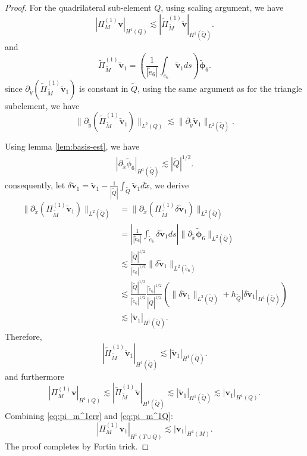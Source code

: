 \documentclass[10pt,a4paper]{amsart}
\begin{document}
\begin{proof}
	For the quadrilateral sub-element $Q$, using scaling argument, we have
	\begin{equation*}
		|\Pi^{(1)}_M \boldsymbol{v}|_{H^1(Q)} \lesssim |\tilde{\Pi}^{(1)}_{\tilde{M}} \boldsymbol{\tilde{v}}|_{H^1(\tilde{Q})}.
	\end{equation*}
    and 
    \[
    \tilde{\Pi}^{(1)}_{\tilde{M}} \boldsymbol{\tilde{v}}_1 = \left( \frac{1}{|\tilde{e}_6|} \int_{\tilde{e}_6} \boldsymbol{\tilde{v}}_1  ds \right) \boldsymbol{\tilde{\phi}}_6.
    \]
    since $\partial_{\tilde{y}} (\tilde{\Pi}^{(1)}_{\tilde{M}} \boldsymbol{\tilde{v}}_1)$ is constant in $\tilde{Q}$, using the same argument as for the triangle subelement, we have 
    \[
    \|\partial_{\tilde{y}} (\tilde{\Pi}^{(1)}_{\tilde{M}} \boldsymbol{\tilde{v}}_1)\|_{L^2(Q)} \lesssim \|\partial_{\tilde{y}} \boldsymbol{\tilde{v}}_1\|_{L^2(\tilde{Q})}.
    \]
    
    Using lemma \ref{lem:basis-est}, we have
    \begin{align*}
    	|\partial_{\tilde{x}}\tilde{\phi}_6|_{H^1(\tilde{Q})}\lesssim |\tilde{Q}|^{1/2}.
    \end{align*}
    consequently,  let $\delta \boldsymbol{\tilde{v}}_1 = \boldsymbol{\tilde{v}}_1 - \frac{1}{|\tilde{Q}|}\int_{\tilde{Q}}\boldsymbol{\tilde{v}}_1 d\tilde{x}$, we derive
	\begin{align*}
		\|\partial_{\tilde{x}} (\Pi^{(1)}_{\tilde{M}} \boldsymbol{\tilde{v}}_1)\|_{L^2(\tilde{Q})} 
		&=\|\partial_{\tilde{x}} (\Pi^{(1)}_{\tilde{M}} \delta\boldsymbol{\tilde{v}}_1)\|_{L^2(\tilde{Q})} \\
		&= \left| \frac{1}{|\tilde{e}_6|} \int_{\tilde{e}_6} \delta\boldsymbol{\tilde{v}}_1  ds \right| \|\partial_{\tilde{x}} \boldsymbol{\tilde{\phi}}_6\|_{L^2(\tilde{Q})} \\
		&\lesssim \frac{|\tilde{Q}|^{1/2}}{|\tilde{e}_6|^{1/2}}\|\delta\boldsymbol{\tilde{v}}_1\|_{L^2(\tilde{e}_6)}\\
		&\lesssim \frac{|\tilde{Q}|^{1/2}}{|\tilde{e}_6|^{1/2}} \frac{|\tilde{e}_6|^{1/2}}{|\tilde{Q}|^{1/2}}(\|\delta\boldsymbol{\tilde{v}}_1\|_{L^2(\tilde{Q})} + h_{\tilde{Q}}|\delta\boldsymbol{\tilde{v}}_1|_{H^1(\tilde{Q})} )\\
		&\lesssim |\boldsymbol{\tilde{v}}_1|_{H^1(\tilde{Q})}.
	\end{align*}
	Therefore,
	\begin{equation}\label{eq:pi_m^1Q}
		|\tilde{\Pi}^{(1)}_{\tilde{M}} \boldsymbol{\tilde{v}}_1|_{H^1(\tilde{Q})} \lesssim |\boldsymbol{\tilde{v}}_1|_{H^1(\tilde{Q})}.
	\end{equation}
	and furthermore
	\begin{equation*}
		|\Pi^{(1)}_M \boldsymbol{v}|_{H^1(Q)} \lesssim |\tilde{\Pi}^{(1)}_{\tilde{M}} \boldsymbol{\tilde{v}}|_{H^1(\tilde{Q})}
		\lesssim |\boldsymbol{\tilde{v}}_1|_{H^1(\tilde{Q})}\lesssim |\bm{v}_1|_{H^1(Q)}.
	\end{equation*}
	Combining \eqref{eq:pi_m^1err} and \eqref{eq:pi_m^1Q}:
	\begin{equation}\label{eq:pi_m^1QT}
		|\Pi^{(1)}_M \boldsymbol{v}_1|_{H^1(T \cup Q)} \lesssim |\boldsymbol{v}_1|_{H^1(M)}.
	\end{equation}
	The proof completes by Fortin trick.
\end{proof}
\end{document}

